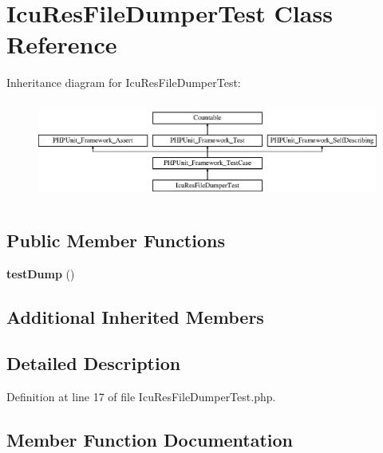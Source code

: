\section{Icu\+Res\+File\+Dumper\+Test Class Reference}
\label{class_symfony_1_1_component_1_1_translation_1_1_tests_1_1_dumper_1_1_icu_res_file_dumper_test}
Inheritance diagram for Icu\+Res\+File\+Dumper\+Test\+:\begin{figure}[H]
\begin{center}
\leavevmode
\includegraphics[height=3.303835cm]{class_symfony_1_1_component_1_1_translation_1_1_tests_1_1_dumper_1_1_icu_res_file_dumper_test}
\end{center}
\end{figure}
\subsection*{Public Member Functions}
\begin{DoxyCompactItemize}
\item 
{\bf test\+Dump} ()
\end{DoxyCompactItemize}
\subsection*{Additional Inherited Members}


\subsection{Detailed Description}


Definition at line 17 of file Icu\+Res\+File\+Dumper\+Test.\+php.



\subsection{Member Function Documentation}
